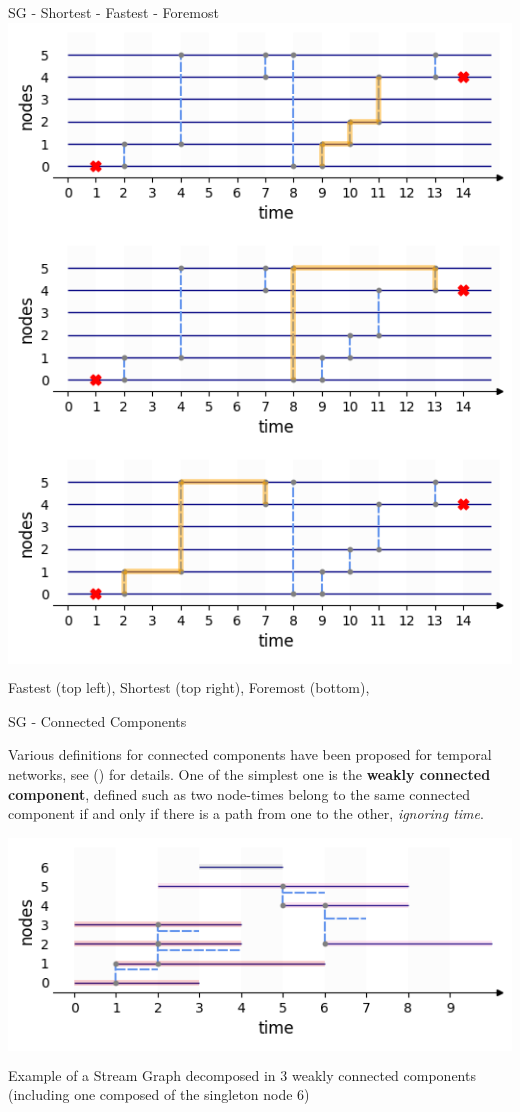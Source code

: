 \documentclass[a4paper,11pt]{book}
\begin{document}
\begin{textbox}{SG - Shortest - Fastest - Foremost}
\centering
\colorbox{white}{\includegraphics[width=0.45\linewidth]{pics/dynamic/fastest.png}}
\colorbox{white}{\includegraphics[width=0.45\linewidth]{pics/dynamic/shortest.png}}
\colorbox{white}{\includegraphics[width=0.45\linewidth]{pics/dynamic/foremost.png}}

Fastest (top left),  Shortest (top right), Foremost (bottom),

\end{textbox}

\begin{textbox}{SG - Connected Components}

Various definitions for connected components have been proposed for temporal networks, see  (\cite{latapy2018stream}) for details. One of the simplest one is the \textbf{weakly connected component}, defined such as two node-times belong to the same connected component if and only if there is a path from one to the other, \textit{ignoring time}. 

\centering
\colorbox{white}{\includegraphics[width=0.8\linewidth]{pics/dynamic/CC.png}}

Example of a Stream Graph decomposed in 3 weakly connected components (including one composed of the singleton node 6)
\end{textbox}
\end{document}
